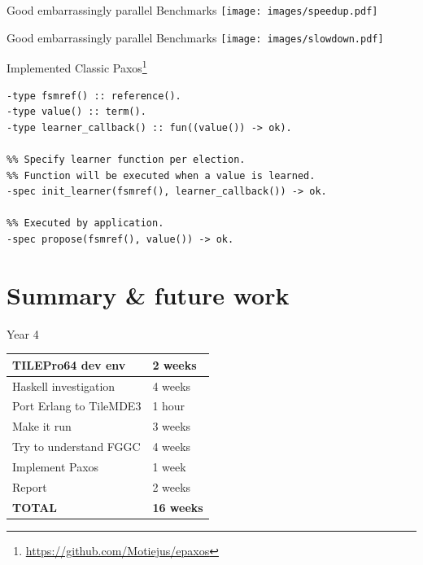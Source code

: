 \documentclass[14pt]{beamer}
\begin{document}
\begin{frame}{Good embarrassingly parallel Benchmarks}
    \texttt{[image: images/speedup.pdf]}
\end{frame}

\begin{frame}{Good embarrassingly parallel Benchmarks}
    \texttt{[image: images/slowdown.pdf]}
\end{frame}

\begin{frame}[fragile]{Implemented Classic Paxos\footnote{
    \url{https://github.com/Motiejus/epaxos}}}

        \fontsize{11pt}{14}\selectfont \begin{verbatim}
-type fsmref() :: reference().
-type value() :: term().
-type learner_callback() :: fun((value()) -> ok).

%% Specify learner function per election.
%% Function will be executed when a value is learned.
-spec init_learner(fsmref(), learner_callback()) -> ok.

%% Executed by application.
-spec propose(fsmref(), value()) -> ok.
    \end{verbatim}
\end{frame}

\section{Summary \& future work}

\begin{frame}{Year 4}
    \begin{tabular}{|l|l|}
        \hline
        TILEPro64 dev env & 2 weeks \\ \hline
    Haskell investigation & 4 weeks \\ \hline
  Port Erlang to TileMDE3 & 1 hour \\ \hline
              Make it run & 3 weeks \\ \hline
   Try to understand FGGC & 4 weeks \\ \hline
          Implement Paxos & 1 week \\ \hline
                   Report & 2 weeks \\ \hline \hline
               \bf{TOTAL} & \bf{16 weeks} \\ \hline
    \end{tabular}
\end{frame}

\end{document}
